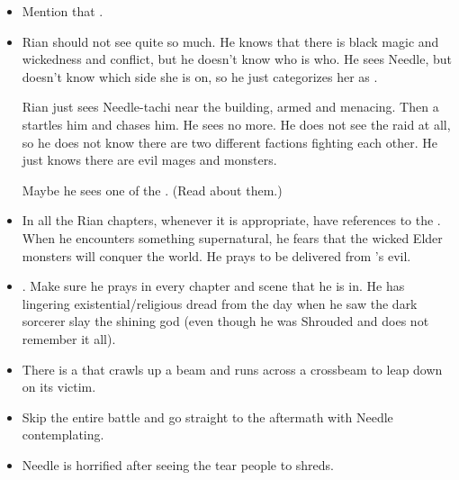 \begin{changes}
\begin{itemize}
      \item 
        Mention that . 
      \item 
        Rian should not see quite so much. 
        He knows that there is black magic and wickedness and conflict, but he doesn't know who is who. 
        He sees Needle, but doesn't know which side she is on, so he just categorizes her as .
        
        Rian just sees Needle-tachi near the building, armed and menacing. 
        Then a \grimrat{} startles him and chases him. 
        He sees no more. 
        He does not see the raid at all, so he does not know there are two different factions fighting each other. 
        He just knows there are evil mages and monsters. 
        
        Maybe he sees one of the . 
        (Read about them.) 
      \item 
        In all the Rian chapters, whenever it is appropriate, have references to the . 
        When he encounters something supernatural, he fears that the wicked Elder monsters will conquer the world. 
        He prays to be delivered from \Isphet's evil. 
      \item 
        .
        Make sure he prays in every chapter and scene that he is in.
        He has lingering existential/religious dread from the day when he saw the dark sorcerer slay the shining god (even though he was Shrouded and does not remember it all). 
      \item 
        There is a \grimrat{} that crawls up a beam and runs across a crossbeam to leap down on its victim. 
      \item 
        Skip the entire battle and go straight to the aftermath with Needle contemplating. 
      \item 
        Needle is horrified after seeing the \grimrats{} tear people to shreds. 
        

\end{itemize}
\end{changes}
